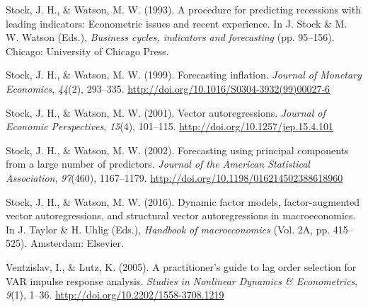 \documentclass[12pt,twoside]{reedthesis}
\begin{document}
\leavevmode\hypertarget{ref-stocwats:1993}{}%
Stock, J. H., \& Watson, M. W. (1993). A procedure for predicting recessions with leading indicators: Econometric issues and recent experience. In J. Stock \& M. W. Watson (Eds.), \emph{Business cycles, indicators and forecasting} (pp. 95--156). Chicago: University of Chicago Press.

\leavevmode\hypertarget{ref-stocwats:1999}{}%
Stock, J. H., \& Watson, M. W. (1999). Forecasting inflation. \emph{Journal of Monetary Economics}, \emph{44}(2), 293--335. \url{http://doi.org/10.1016/S0304-3932(99)00027-6}

\leavevmode\hypertarget{ref-stocwats:2001}{}%
Stock, J. H., \& Watson, M. W. (2001). Vector autoregressions. \emph{Journal of Economic Perspectives}, \emph{15}(4), 101--115. \url{http://doi.org/10.1257/jep.15.4.101}

\leavevmode\hypertarget{ref-stocwats:2002}{}%
Stock, J. H., \& Watson, M. W. (2002). Forecasting using principal components from a large number of predictors. \emph{Journal of the American Statistical Association}, \emph{97}(460), 1167--1179. \url{http://doi.org/10.1198/016214502388618960}

\leavevmode\hypertarget{ref-stocwats:2016}{}%
Stock, J. H., \& Watson, M. W. (2016). Dynamic factor models, factor-augmented vector autoregressions, and structural vector autoregressions in macroeconomics. In J. Taylor \& H. Uhlig (Eds.), \emph{Handbook of macroeconomics} (Vol. 2A, pp. 415--525). Amsterdam: Elsevier.

\leavevmode\hypertarget{ref-ventlutz:2005}{}%
Ventzislav, I., \& Lutz, K. (2005). A practitioner's guide to lag order selection for VAR impulse response analysis. \emph{Studies in Nonlinear Dynamics \& Econometrics}, \emph{9}(1), 1--36. \url{http://doi.org/10.2202/1558-3708.1219}


\end{document}

